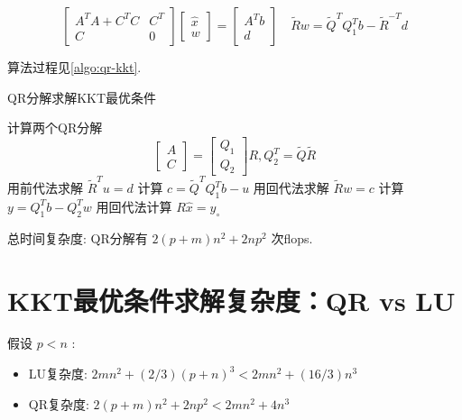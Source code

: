 $$ \left[\begin{array}{cc}A^{T} A+C^{T} C & C^{T} \\ C & 0\end{array}\right]\left[\begin{array}{c}\hat{x} \\ w\end{array}\right]=\left[\begin{array}{c}A^{T} b \\ d\end{array}\right] \quad \tilde{R} w=\tilde{Q}^{T} Q_{1}^{T} b-\tilde{R}^{-T} d $$

算法过程见\ref{algo:qr-kkt}.

\begin{algorithm}[htbp]
    \caption{QR分解求解KKT最优条件}

    \label{algo:qr-kkt}
    计算两个QR分解
$$
\left[\begin{array}{l}
A\\
C
\end{array}\right]=\left[\begin{array}{l}
Q_{1} \\
Q_{2}
\end{array}\right] R, Q_{2}^{T}=\tilde{Q} \tilde{R}
$$\;
用前代法求解 $ \tilde{R}^{T} u=d $ \;
计算 $ c=\tilde{Q}^{T} Q_{1}^{T} b-u $\;
用回代法求解 $ \tilde{R} w=c $ \;
计算 $ y=Q_{1}^{T} b-Q_{2}^{T} w $\;
用回代法计算 $ R \hat{x}=y_{\circ} $\;

\end{algorithm}

总时间复杂度: QR分解有 $ 2(p+m) n^{2}+2 n p^{2} $ 次flops.


\section{KKT最优条件求解复杂度：QR vs LU}

假设 $ p<n $ :

\begin{itemize}
    \item LU复杂度: $ 2 m n^{2}+(2 / 3)(p+n)^{3}<2 m n^{2}+(16 / 3) n^{3} $
    \item QR复杂度: $ 2(p+m) n^{2}+2 n p^{2}<2 m n^{2}+4 n^{3} $
\end{itemize}

